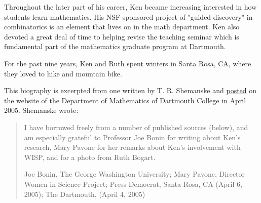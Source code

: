 \documentclass[10pt,]{book}
\theoremstyle{plain}
\theoremstyle{definition}
\theoremstyle{definition}
\numberwithin{equation}{chapter}
\begin{document}
Throughout the later part of his career, Ken became increasing interested in how students learn mathematics. His NSF-sponsored project of "guided-discovery" in combinatorics is an element that lives on in the math department. Ken also devoted a great deal of time to helping revise the teaching seminar which is fundamental part of the mathematics graduate program at Dartmouth.%
\par
\hypertarget{p-4}{}%
For the past nine years, Ken and Ruth spent winters in Santa Rosa, CA, where they loved to hike and mountain bike.%
\par
\hypertarget{p-5}{}%
This biography is excerpted from one written by T. R. Shemanske and \href{https://math.dartmouth.edu/publicity/general/kpbogart-life.phtml}{posted} on the website of the Department of Mathematics of Dartmouth College in April 2005. Shemanske wrote:%
\begin{quote}\hypertarget{blockquote-1}{}
\hypertarget{p-6}{}%
I have borrowed freely from a number of published sources (below), and am especially grateful to Professor Joe Bonin for writing about Ken's research, Mary Pavone for her remarks about Ken's involvement with WISP, and for a photo from Ruth Bogart.%
\par
\hypertarget{p-7}{}%
Joe Bonin, The George Washington University; Mary Pavone, Director Women in Science Project; Press Democrat, Santa Rosa, CA (April 6, 2005); The Dartmouth, (April 4, 2005)%
\end{quote}
\cleardoublepage%
\end{document}
